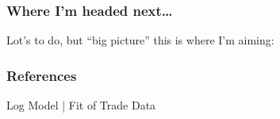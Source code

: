 \documentclass[9pt,pdftex,aspectratio=1610]{beamer}
\theoremstyle{definition}
\begin{document}


\begin{frame}[t]
\frametitle{Where I'm headed next\ldots}
\smallskip
Lot's to do, but ``big picture'' this is where I'm aiming:\\

\end{frame}



\appendix

\setcounter{finalframe}{\value{framenumber}}

\begin{frame}[allowframebreaks]
\frametitle{References}
\scriptsize

\end{frame}


\begin{frame}[t]{Log Model | Fit of Trade Data}
\begin{figure}[!t]
\end{figure}
\end{frame}
\end{document}

